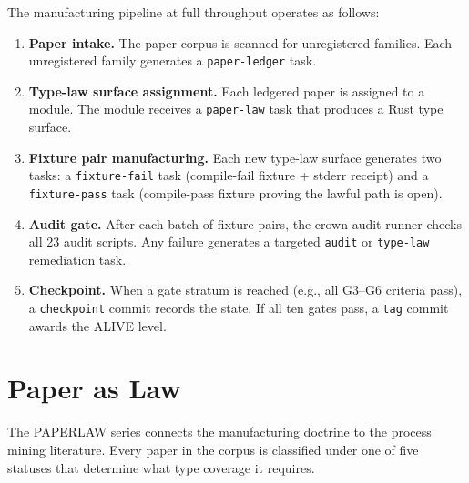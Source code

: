 The manufacturing pipeline at full throughput operates as follows:

\begin{enumerate}
  \item \textbf{Paper intake.} The paper corpus is scanned for unregistered families. Each
        unregistered family generates a \texttt{paper-ledger} task.

  \item \textbf{Type-law surface assignment.} Each ledgered paper is assigned to a module.
        The module receives a \texttt{paper-law} task that produces a Rust type surface.

  \item \textbf{Fixture pair manufacturing.} Each new type-law surface generates two tasks:
        a \texttt{fixture-fail} task (compile-fail fixture + stderr receipt) and a
        \texttt{fixture-pass} task (compile-pass fixture proving the lawful path is open).

  \item \textbf{Audit gate.} After each batch of fixture pairs, the crown audit runner
        checks all 23 audit scripts. Any failure generates a targeted \texttt{audit} or
        \texttt{type-law} remediation task.

  \item \textbf{Checkpoint.} When a gate stratum is reached (e.g., all G3--G6 criteria
        pass), a \texttt{checkpoint} commit records the state. If all ten gates pass, a
        \texttt{tag} commit awards the ALIVE level.
\end{enumerate}

\section{Paper as Law}
\label{sec:doctrine-paper}

The PAPERLAW series connects the manufacturing doctrine to the process mining literature.
Every paper in the corpus is classified under one of five statuses that determine what type
coverage it requires.

